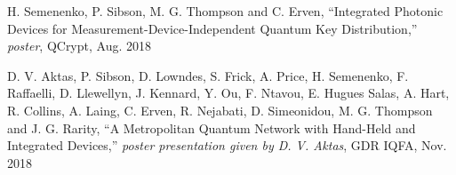 {H. Semenenko, P. Sibson, M. G. Thompson and C. Erven, ``Integrated Photonic Devices for Measurement-Device-Independent Quantum Key Distribution,'' \textit{poster}, QCrypt, Aug. 2018

D. V. Aktas, P. Sibson, D. Lowndes, S. Frick, A. Price, H. Semenenko, F. Raffaelli, D. Llewellyn, J. Kennard, Y. Ou, F. Ntavou, E. Hugues Salas, A. Hart, R. Collins, A. Laing, C. Erven, R. Nejabati, D. Simeonidou, M. G. Thompson and J. G. Rarity, ``A Metropolitan Quantum Network with Hand-Held and Integrated Devices,'' \textit{poster presentation given by D. V. Aktas}, GDR IQFA, Nov. 2018
}
\clearpage